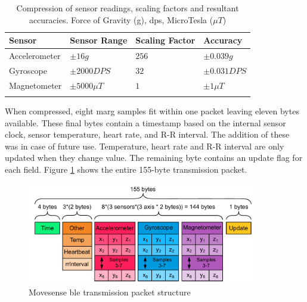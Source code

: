 \begin{table}[hbt]
    \centering
    \caption[Compression of sensor readings, scaling factors and resultant accuracies]{Compression of sensor readings, scaling factors and resultant accuracies. Force of Gravity (g), \acrfull{dps}, MicroTesla ($\mu T$)} %
    \label{tab:methods-imu-data-compression-factors}
    
    \begin{tabularx}{\textwidth}{Y|YYY}
        \textbf{Sensor} & \textbf{Sensor Range} & \textbf{Scaling Factor} & \textbf{Accuracy} \\
        \hline
        Accelerometer & $\pm16 g$ & $256$ & $\pm0.039 g$ \\
        Gyroscope & $\pm2000 DPS$ & $32$ & $\pm0.031 DPS$ \\
        Magnetometer & $\pm5000\mu T$ & $1$ & $\pm1\mu T$ \\
    \end{tabularx}
\end{table}

When compressed, eight \acrshort{marg} samples fit within one packet leaving eleven bytes available. These final bytes contain a timestamp based on the internal sensor clock, sensor temperature, heart rate, and R-R interval. The addition of these was in case of future use. Temperature, heart rate and R-R interval are only updated when they change value. The remaining byte contains an update flag for each field. Figure \ref{fig:methods-ble-packet-structure} shows the entire 155-byte transmission packet.

\begin{figure}[hbt]
    \centering
    \includegraphics[width=0.9\textwidth]{content/3-Methods/BLE_Bytes_Packets.pdf}
    \caption[Movesense  transmission packet structure]{Movesense \acrlong{ble} transmission packet structure}    \label{fig:methods-ble-packet-structure}
\end{figure}


